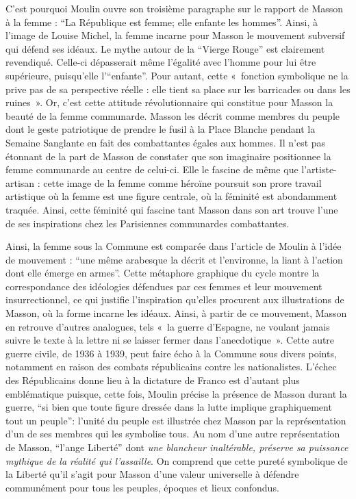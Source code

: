     C’est pourquoi Moulin ouvre son troisième paragraphe sur le rapport de Masson à la femme : \enquote{La République est femme; elle enfante les hommes}. Ainsi, à l’image de Louise Michel, la femme incarne pour Masson le mouvement subversif qui défend ses idéaux. Le mythe autour de la \enquote{Vierge Rouge} est clairement revendiqué. Celle-ci dépasserait même l’égalité avec l’homme pour lui être supérieure, puisqu’elle l’\enquote{enfante}. Pour autant, cette « fonction symbolique ne la prive pas de sa perspective réelle : elle tient sa place sur les barricades ou dans les ruines ». Or, c’est cette attitude révolutionnaire qui constitue pour Masson la beauté de la femme communarde. Masson les décrit comme membres du peuple dont le geste patriotique de prendre le fusil à la Place Blanche pendant la Semaine Sanglante en fait des combattantes égales aux hommes. Il n'est pas étonnant de la part de Masson de constater que son imaginaire positionnee la femme communarde au centre de celui-ci. Elle le fascine de même que l'artiste-artisan : cette image de la femme comme héroïne poursuit son prore travail artistique où la femme est une figure centrale, où la féminité est abondamment traquée. Ainsi, cette féminité qui fascine tant  Masson dans son art trouve l'une de ses inspirations chez les Parisiennes communardes combattantes. 

    Ainsi, la femme sous la Commune est comparée dans l’article de Moulin à l’idée de mouvement : \enquote{une même arabesque la décrit et l’environne, la liant à l’action dont elle émerge en armes}. Cette métaphore graphique du cycle montre la correspondance des idéologies défendues par ces femmes et leur mouvement insurrectionnel, ce qui justifie l’inspiration qu’elles procurent aux illustrations de Masson, où la forme incarne les idéaux. Ainsi, à partir de ce mouvement, Masson en retrouve d’autres analogues, tels « la guerre d’Espagne, ne voulant jamais suivre le texte à la lettre ni se laisser fermer dans l’anecdotique ». Cette autre guerre civile, de 1936 à 1939, peut faire écho à la Commune sous divers points, notamment en raison des combats républicains contre les nationalistes. L’échec des Républicains donne lieu à la dictature de Franco est d’autant plus emblématique puisque, cette fois, Moulin précise la présence de Masson durant la guerre, \enquote{si bien que toute figure dressée dans la lutte implique graphiquement tout un peuple}: l’unité du peuple est illustrée chez Masson par la représentation d’un de ses membres qui les symbolise tous. Au nom  d’une autre représentation de Masson, \enquote{l’ange Liberté} dont \emph{une blancheur inaltérable, préserve sa puissance mythique de la réalité qui l’assaille}. On comprend que cette pureté symbolique de la Liberté qu’il s’agit pour Masson d’une valeur universelle à défendre communément pour tous les peuples, époques et lieux confondus. 


